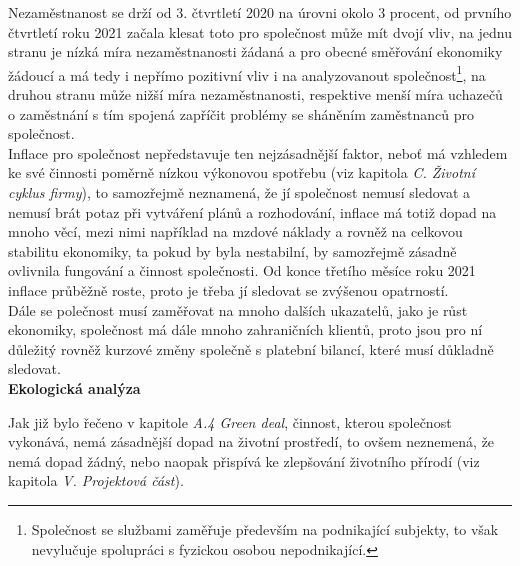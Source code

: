 Nezaměstnanost se drží od 3. čtvrtletí 2020 na úrovni okolo 3 procent, od prvního čtvrtletí roku 2021 začala klesat toto pro společnost může mít dvojí vliv, na jednu stranu je nízká míra nezaměstnanosti žádaná a pro obecné směřování ekonomiky žádoucí a má tedy i nepřímo pozitivní vliv i na analyzovanout společnost\footnote{Společnost se službami zaměřuje především na podnikající subjekty, to však nevylučuje spolupráci s fyzickou osobou nepodnikající.}, na druhou stranu může nižší míra nezaměstnanosti, respektive menší míra uchazečů o zaměstnání s tím spojená zapříčit problémy se sháněním zaměstnanců pro společnost.\\

Inflace pro společnost nepředstavuje ten nejzásadnější faktor, neboť má vzhledem ke své činnosti poměrně nízkou výkonovou spotřebu (viz kapitola \textit{C. Životní cyklus firmy}), to samozřejmě neznamená, že jí společnost nemusí sledovat a nemusí brát potaz při vytváření plánů a rozhodování, inflace má totiž dopad na mnoho věcí, mezi nimi například na mzdové náklady a rovněž na celkovou stabilitu ekonomiky, ta pokud by byla nestabilní, by samozřejmě zásadně ovlivnila fungování a činnost společnosti. Od konce třetího měsíce roku 2021 inflace průběžně roste, proto je třeba jí sledovat se zvýšenou opatrností.\\

Dále se polečnost musí zaměřovat na mnoho dalších ukazatelů, jako je růst ekonomiky, společnost má dále mnoho zahraničních klientů, proto jsou pro ní důležitý rovněž kurzové změny společně s platební bilancí, které musí důkladně sledovat.\\




\noindent\textbf{Ekologická analýza}\\

\vspace*{-2mm}

Jak již bylo řečeno v kapitole \textit{A.4 Green deal}, činnost, kterou společnost vykonává, nemá zásadnější dopad na životní prostředí, to ovšem neznemená, že nemá dopad žádný, nebo naopak přispívá ke zlepšování životního přírodí (viz kapitola \textit{V. Projektová část}).\\


